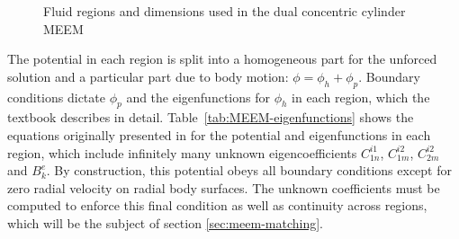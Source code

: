 \begin{appendices}
\begin{figure}[htbp]
\centering

\caption{Fluid regions and dimensions used in the dual concentric cylinder MEEM}
\label{fig:meem-regions}
\end{figure}

 The potential in each region is split into a homogeneous part for the unforced solution and a particular part due to body motion: $\phi=\phi_h+\phi_p$.
Boundary conditions dictate $\phi_p$ and the eigenfunctions for $\phi_h$ in each region, which the textbook \cite{chatjigeorgiou_analytical_2018} describes in detail.
Table~\ref{tab:MEEM-eigenfunctions} shows the equations originally presented in \cite{chau_inertia_2010,chau_inertia_2012} for the potential and eigenfunctions in each region, which include infinitely many unknown eigencoefficients $C_{1n}^{i1}$, $C_{1m}^{i2}$, $C_{2m}^{i2}$ and $B_{k}^{e}$.
By construction, this potential obeys all boundary conditions except for zero radial velocity on radial body surfaces.
The unknown coefficients must be computed to enforce this final condition as well as continuity across regions, which will be the subject of section \ref{sec:meem-matching}.


\end{appendices}
